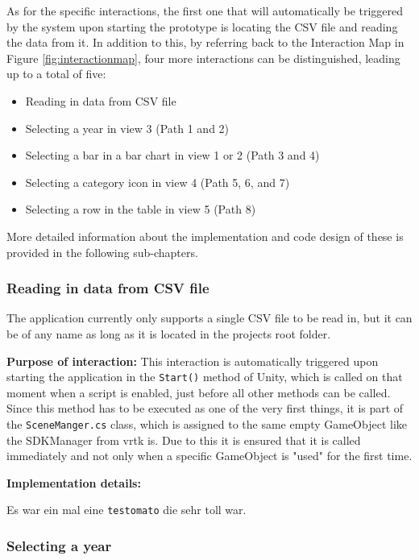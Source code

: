 As for the specific interactions, the first one that will automatically be triggered by the system upon starting the prototype is locating the CSV file and reading the data from it. In addition to this, by referring back to the Interaction Map in Figure \ref{fig:interactionmap}, four more interactions can be distinguished, leading up to a total of five:
\begin{itemize}[noitemsep,nolistsep]
	\item Reading in data from CSV file
	\item Selecting a year in view 3 (Path 1 and 2)
	\item Selecting a bar in a bar chart in view 1 or 2 (Path 3 and 4)
	\item Selecting a category icon in view 4 (Path 5, 6, and 7)
	\item Selecting a row in the table in view 5 (Path 8)
\end{itemize}
More detailed information about the implementation and code design of these is provided in the following sub-chapters.


\subsubsection{Reading in data from CSV file}

The application currently only supports a single CSV file to be read in, but it can be of any name as long as it is located in the projects root folder.

\textbf{Purpose of interaction:} This interaction is automatically triggered upon starting the application in the \texttt{Start()} method of Unity, which is called on that moment when a script is enabled, just before all other methods can be called. Since this method has to be executed as one of the very first things, it is part of the \texttt{SceneManger.cs} class, which is assigned to the same empty GameObject like the SDKManager from \gls{vrtk} is. Due to this it is ensured that it is called immediately and not only when a specific GameObject is "used" for the first time.

\textbf{Implementation details:}

Es war ein mal eine \texttt{testomato} die sehr toll war.

\subsubsection{Selecting a year}

